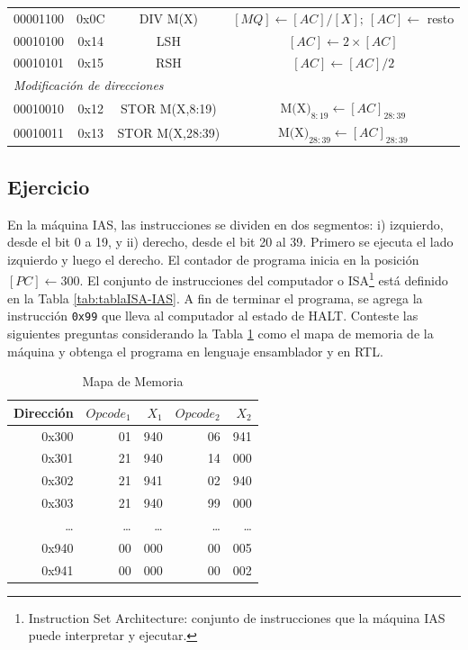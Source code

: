 \documentclass{article}
\begin{document}
\begin{table}[htbp]
\begin{tabular}{|cccc|}
    00001100 & 0x0C       &  DIV M(X)         & $[MQ]\leftarrow[AC]/[X];\ [AC]\leftarrow$ resto\\
    00010100 & 0x14       &  LSH              & $[AC]\leftarrow 2\times[AC]$\\
    00010101 & 0x15       &  RSH              & $[AC]\leftarrow[AC]/2$\\ \hline
    \multicolumn{4}{|l|}{\textit{Modificación de direcciones}} \\ \hline
    00010010 & 0x12       &  STOR M(X,8:19)   & $\text{M(X)}_{8:19}\leftarrow[AC]_{28:39}$\\
    00010011 & 0x13       &  STOR M(X,28:39)  & $\text{M(X)}_{28:39}\leftarrow[AC]_{28:39}$\\
    \hline
  \end{tabular}
\end{table}

\newpage

\subsection{Ejercicio}
\label{sec:org98e35ad}

En la máquina IAS, las instrucciones se dividen en dos segmentos:
i) izquierdo, desde el bit 0 a 19, y ii) derecho, desde el bit 20 al 39. Primero
se ejecuta el lado izquierdo y luego el derecho. El
contador de programa inicia en la posición \([PC] \leftarrow 300\). El conjunto de
instrucciones del computador o ISA\footnote{Instruction Set Architecture: conjunto de instrucciones que la máquina IAS puede interpretar y ejecutar.} está definido en la Tabla
\ref{tab:tablaISA-IAS}. A fin de terminar el programa, se agrega la
instrucción \texttt{0x99} que lleva al computador al estado de HALT. Conteste las
siguientes preguntas considerando la Tabla \ref{tab:org40a7892} como el
mapa de memoria de la máquina y obtenga el programa en lenguaje ensamblador y en
RTL.

\begin{table}[htbp]
\caption{\label{tab:org40a7892}Mapa de Memoria}
\centering
\begin{tabular}{rrrrr}
\hline
Dirección & \(Opcode_1\) & \(X_1\) & \(Opcode_2\) & \(X_2\)\\[0pt]
\hline
0x300 & 01 & 940 & 06 & 941\\[0pt]
0x301 & 21 & 940 & 14 & 000\\[0pt]
0x302 & 21 & 941 & 02 & 940\\[0pt]
0x303 & 21 & 940 & 99 & 000\\[0pt]
\ldots{} & \ldots{} & \ldots{} & \ldots{} & \ldots{}\\[0pt]
0x940 & 00 & 000 & 00 & 005\\[0pt]
0x941 & 00 & 000 & 00 & 002\\[0pt]
\hline
\end{tabular}
\end{table}
\end{document}
